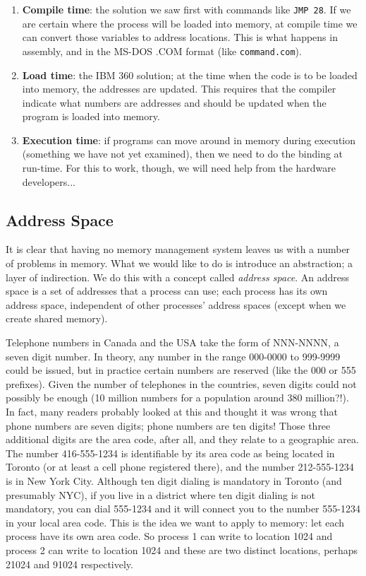 \begin{enumerate}
	\item \textbf{Compile time}: the solution we saw first with commands like \texttt{JMP 28}. If we are certain where the process will be loaded into memory, at compile time we can convert those variables to address locations. This is what happens in assembly, and in the MS-DOS .COM format (like \texttt{command.com}).
	\item \textbf{Load time}: the IBM 360 solution; at the time when the code is to be loaded into memory, the addresses are updated. This requires that the compiler indicate what numbers are addresses and should be updated when the program is loaded into memory.
	\item \textbf{Execution time}: if programs can move around in memory during execution (something we have not yet examined), then we need to do the binding at run-time. For this to work, though, we will need help from the hardware developers...
\end{enumerate}

\subsection*{Address Space}
It is clear that having no memory management system leaves us with a number of problems in memory. What we would like to do is introduce an abstraction; a layer of indirection. We do this with a concept called \textit{address space}. An address space is a set of addresses that a process can use; each process has its own address space, independent of other processes' address spaces (except when we create shared memory).

Telephone numbers in Canada and the USA take the form of NNN-NNNN, a seven digit number. In theory, any number in the range 000-0000 to 999-9999 could be issued, but in practice certain numbers are reserved (like the 000 or 555 prefixes). Given the number of telephones in the countries, seven digits could not possibly be enough (10 million numbers for a population around 380 million?!). In fact, many readers probably looked at this and thought it was wrong that phone numbers are seven digits; phone numbers are ten digits! Those three additional digits are the area code, after all, and they relate to a geographic area. The number 416-555-1234 is identifiable by its area code as being located in Toronto (or at least a cell phone registered there), and the number 212-555-1234 is in New York City. Although ten digit dialing is mandatory in Toronto (and presumably NYC), if you live in a district where ten digit dialing is not mandatory, you can dial 555-1234 and it will connect you to the number 555-1234 in your local area code. This is the idea we want to apply to memory: let each process have its own area code. So process 1 can write to location 1024 and process 2 can write to location 1024 and these are two distinct locations, perhaps 21024 and 91024 respectively.

